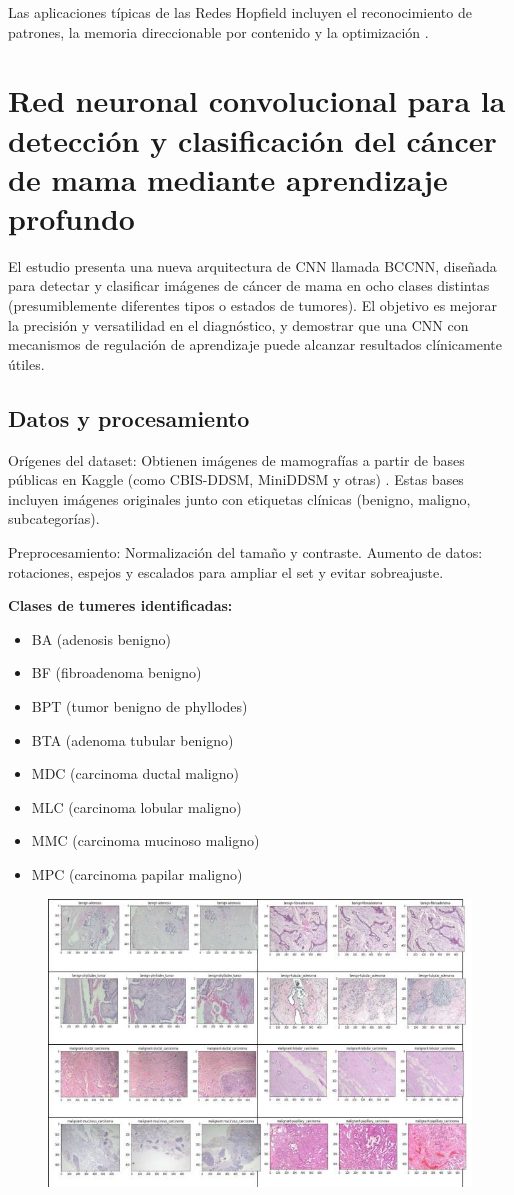 Las aplicaciones típicas de las Redes Hopfield incluyen el reconocimiento de patrones, la memoria direccionable por contenido y la optimización .

\section{Red neuronal convolucional para la detección y clasificación del cáncer de mama mediante aprendizaje profundo}
El estudio presenta una nueva arquitectura de CNN llamada BCCNN, diseñada para detectar y clasificar imágenes de cáncer de mama en ocho clases distintas (presumiblemente diferentes tipos o estados de tumores). El objetivo es mejorar la precisión y versatilidad en el diagnóstico, y demostrar que una CNN con mecanismos de regulación de aprendizaje puede alcanzar resultados clínicamente útiles.
\subsection{Datos y procesamiento}

Orígenes del dataset: Obtienen imágenes de mamografías a partir de bases públicas en Kaggle (como CBIS-DDSM, MiniDDSM y otras) .
Estas bases incluyen imágenes originales junto con etiquetas clínicas (benigno, maligno, subcategorías).

Preprocesamiento:
Normalización del tamaño y contraste.
Aumento de datos: rotaciones, espejos y escalados para ampliar el set y evitar sobreajuste.

\textbf{Clases de tumeres identificadas:}
\begin{itemize}
    \item BA (adenosis benigno)
    \item BF (fibroadenoma benigno)
    \item BPT (tumor benigno de phyllodes)
    \item BTA (adenoma tubular benigno)
    \item MDC (carcinoma ductal maligno)
    \item MLC (carcinoma lobular maligno)
    \item MMC (carcinoma mucinoso maligno)
    \item MPC (carcinoma papilar maligno)
\end{itemize}
\begin{figure}
    \centering
    \includegraphics[width=0.5\linewidth]{cancer.jpg}
    \caption{}
    \label{fig:enter-label}
\end{figure}


